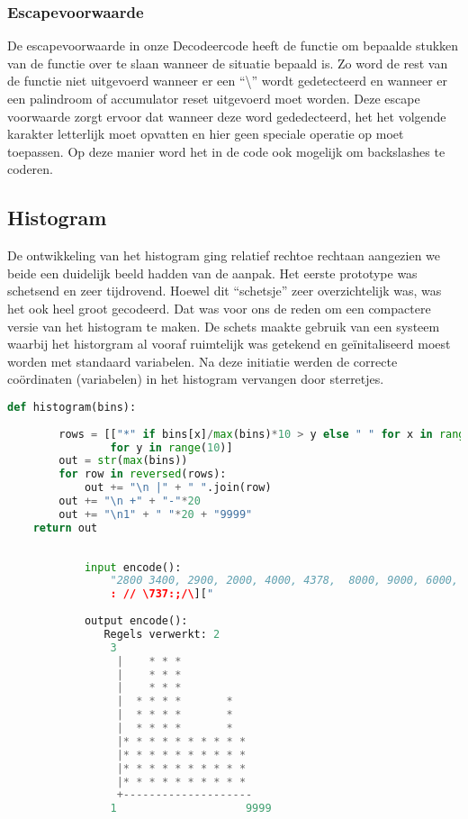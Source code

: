 \documentclass{article}
\begin{document}
    \subsubsection{Escapevoorwaarde}
    De escapevoorwaarde in onze Decodeercode heeft de functie om bepaalde
		stukken van de functie over te slaan wanneer de situatie bepaald is.
		Zo word de rest van de functie niet uitgevoerd wanneer er een ``\textbackslash'' wordt
		gedetecteerd en wanneer er een palindroom of accumulator reset uitgevoerd moet worden.
		Deze escape voorwaarde zorgt ervoor dat wanneer deze word gededecteerd,
		het het volgende karakter letterlijk moet opvatten en hier geen speciale
		operatie op moet toepassen.
		Op deze manier word het in de code ook mogelijk om backslashes te coderen.
    
    \subsection{Histogram}
      De ontwikkeling van het histogram ging relatief rechtoe rechtaan
			aangezien we beide een duidelijk beeld hadden van de aanpak.
			Het eerste prototype was schetsend en zeer tijdrovend.
			Hoewel dit ``schetsje'' zeer overzichtelijk was, was het ook heel
			groot gecodeerd. Dat was voor ons de reden om een compactere versie
			van het histogram te maken. De schets maakte gebruik van een systeem
			waarbij het historgram al vooraf ruimtelijk was getekend en
			ge\"initaliseerd moest worden met standaard variabelen.
			Na deze initiatie werden de correcte co\"ordinaten (variabelen)
			in het histogram vervangen door sterretjes. 
      \begin{lstlisting}[frame=single, language=python] 
    def histogram(bins):
    
        rows = [["*" if bins[x]/max(bins)*10 > y else " " for x in range(10)]
                for y in range(10)]
        out = str(max(bins))
        for row in reversed(rows):
            out += "\n |" + " ".join(row)
        out += "\n +" + "-"*20
        out += "\n1" + " "*20 + "9999"
    return out
      \end{lstlisting}
      
      \newpage
      \begin{lstlisting}[frame=single, language=python]  % Start your code-block
            
            input encode():
                "2800 3400, 2900, 2000, 4000, 4378,  8000, 9000, 6000, 5689, 3478, 4085, 7095, 1010,1785, 3000,8090
                : // \737:;/\]["
    
            output encode():
               Regels verwerkt: 2
                3
                 |    * * *          
                 |    * * *          
                 |    * * *          
                 |  * * * *       *  
                 |  * * * *       *  
                 |  * * * *       *  
                 |* * * * * * * * * *
                 |* * * * * * * * * *
                 |* * * * * * * * * *
                 |* * * * * * * * * *
                 +--------------------
                1                    9999
        \end{lstlisting}
      
\end{document}
